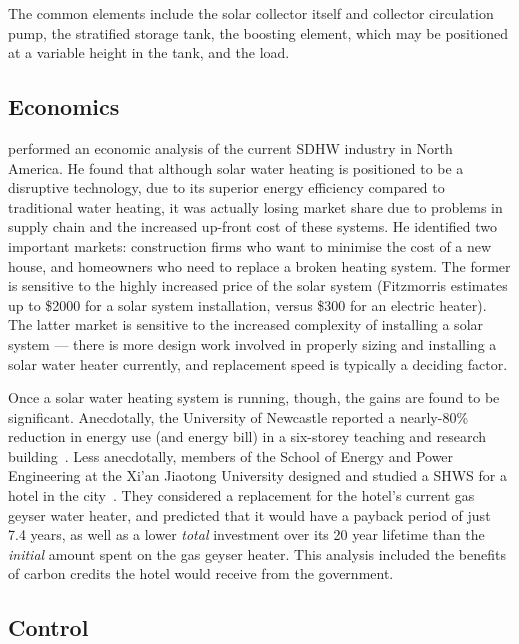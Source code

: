 The common elements include the solar collector itself and collector circulation pump, the stratified storage tank, the boosting element, which may be positioned at a variable height in the tank, and the load.

\subsection{Economics}

\textcite{Fitzmorris10} performed an economic analysis of the current SDHW industry in North America.
He found that although solar water heating is positioned to be a disruptive technology, due to its superior energy efficiency compared to traditional water heating, it was actually losing market share due to problems in supply chain and the increased up-front cost of these systems.
He identified two important markets: construction firms who want to minimise the cost of a new house, and homeowners who need to replace a broken heating system.
The former is sensitive to the highly increased price of the solar system (Fitzmorris estimates up to \$2000 for a solar system installation, versus \$300 for an electric heater).
The latter market is sensitive to the increased complexity of installing a solar system --- there is more design work involved in properly sizing and installing a solar water heater currently, and replacement speed is typically a deciding factor.

Once a solar water heating system is running, though, the gains are found to be significant.
Anecdotally, the University of Newcastle reported a nearly-80\% reduction in energy use (and energy bill) in a six-storey teaching and research building~\cite{ApricusNewcastle}.
Less anecdotally, members of the School of Energy and Power Engineering at the Xi'an Jiaotong University designed and studied a SHWS for a hotel in the city~\cite{Cao14}.
They considered a replacement for the hotel's current gas geyser water heater, and predicted that it would have a payback period of just 7.4 years, as well as a lower \emph{total} investment over its 20 year lifetime than the \emph{initial} amount spent on the gas geyser heater.
This analysis included the benefits of carbon credits the hotel would receive from the government.


\subsection{Control}

